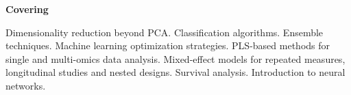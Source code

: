 \documentclass[12pt]{article}\usepackage[]{graphicx}\usepackage[]{color}
\begin{document}
\Large
\LARGE \textbf{Covering} 

\Large Dimensionality reduction beyond PCA. \LARGE Classification algorithms. \Large Ensemble techniques. \LARGE Machine learning optimization strategies. \Large PLS-based methods for single and multi-omics data analysis. \LARGE Mixed-effect models for repeated measures, longitudinal studies and nested designs. \Large Survival analysis. \LARGE Introduction to neural networks.


\large
\vspace{0.2cm}
\end{document}
